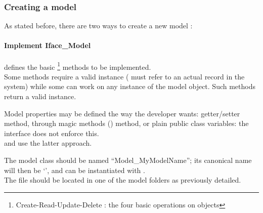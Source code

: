 \documentclass[pdftex,12pt,a4paper]{article}
\begin{document}
\subsubsection{Creating a model} \label{sec:creating-a-model}

As stated before, there are two ways to create a new model :

\paragraph{Implement Iface\_Model}

 defines the basic \footnote{Create-Read-Update-Delete : the four basic operations on objects} methods to be implemented.\\
Some methods require a valid instance (\ie {} must refer to an actual record in the system) while some can work on any instance of the model object. Such methods return a valid instance.

Model properties may be defined the way the developer wants: getter/setter method, through magic methods () method, or plain public class variables: the interface does not enforce this.\\
 and  use the latter approach.

The model class should be named ``Model\_MyModelName''; its canonical name will then be `', and can be instantiated with .\\
The file should be located in one of the model folders as previously detailed.
\end{document}
